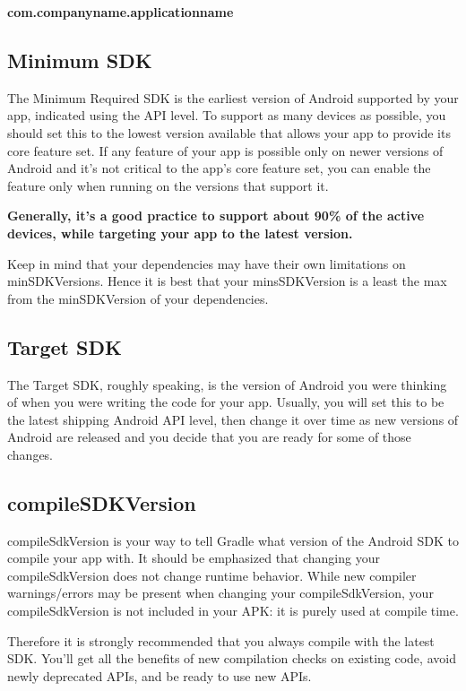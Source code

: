 \begin{center}
	\textbf{com.companyname.applicationname}
\end{center}

\subsection{Minimum SDK}
The Minimum Required SDK is the earliest version of Android supported by your app, indicated using the API level.
To support as many devices as possible, you should set this to the lowest version available that allows your app to provide its core feature set.
If any feature of your app is possible only on newer versions of Android and it's not critical to the app's core feature set, you can enable the feature only when running on the versions that support it.

\textbf{Generally, it’s a good practice to support about 90\% of the active devices, while targeting your app to the latest version.}

Keep in mind that your dependencies may have their own limitations on minSDKVersions.
Hence it is best that your minsSDKVersion is a least the max from the minSDKVersion of your dependencies.

\subsection{Target SDK}
The Target SDK, roughly speaking, is the version of Android you were thinking of when you were writing the code for your app.
Usually, you will set this to be the latest shipping Android API level, then change it over time as new versions of Android are released and you decide that you are ready for some of those changes.

\subsection{compileSDKVersion}
compileSdkVersion is your way to tell Gradle what version of the Android SDK to compile your app with.
It should be emphasized that changing your compileSdkVersion does not change runtime behavior.
While new compiler warnings/errors may be present when changing your compileSdkVersion, your compileSdkVersion is not included in your APK: it is purely used at compile time.

Therefore it is strongly recommended that you always compile with the latest SDK.
You’ll get all the benefits of new compilation checks on existing code, avoid newly deprecated APIs, and be ready to use new APIs.

